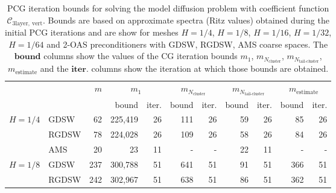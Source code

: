 \begin{table}[H]
\centering
\caption{PCG iteration bounds for solving the model diffusion problem with coefficient function $\mathcal{C}_{\mathrm{3layer, \ vert}}$. Bounds are based on approximate spectra (Ritz values) obtained during the initial PCG iterations and are show for meshes $H=1/4$, $H=1/8$, $H=1/16$, $H=1/32$, $H=1/64$ and 2-OAS preconditioners with GDSW, RGDSW, AMS coarse spaces. The $\textbf{bound}$ columns show the values of the CG iteration bounds $m_1$, $m_{N_{\text{cluster}}}$, $m_{N_{\text{tail-cluster}}}$, $m_{\text{estimate}}$ and the $\textbf{iter.}$ columns show the iteration at which those bounds are obtained.}
\label{tab:cg_iteration_bound_coef=3lvert}
\begin{tabular}{llrrrrrrrrr}
\toprule
 &  & \bfseries $m$ & \multicolumn{2}{|c|}{\bfseries $m_1$} & \multicolumn{2}{|c|}{\bfseries $m_{N_{\text{cluster}}}$} & \multicolumn{2}{|c|}{\bfseries $m_{N_{\text{tail-cluster}}}$} & \multicolumn{2}{|c|}{\bfseries $m_{\text{estimate}}$} \\
 &  &  & bound & iter. & bound & iter. & bound & iter. & bound & iter. \\
\midrule
\multirow[c]{3}{*}{\bfseries $H=1/4$} & GDSW & 62 & {\cellcolor[HTML]{E2E4FB}} \color[HTML]{000000} 225,419 & 26 & {\cellcolor[HTML]{ACB8F4}} \color[HTML]{000000} 111 & 26 & {\cellcolor[HTML]{405FE5}} \color[HTML]{F1F1F1} 59 & 26 & {\cellcolor[HTML]{768BEC}} \color[HTML]{F1F1F1} 85 & 26 \\
\cline{2-11}
\bfseries  & RGDSW & 78 & {\cellcolor[HTML]{E2E4FB}} \color[HTML]{000000} 224,028 & 26 & {\cellcolor[HTML]{ACB8F4}} \color[HTML]{000000} 109 & 26 & {\cellcolor[HTML]{768BEC}} \color[HTML]{F1F1F1} 58 & 26 & {\cellcolor[HTML]{405FE5}} \color[HTML]{F1F1F1} 84 & 26 \\
\cline{2-11}
\bfseries  & AMS & 20 & {\cellcolor[HTML]{768BEC}} \color[HTML]{F1F1F1} 23 & 11 & {\cellcolor[HTML]{ACB8F4}} \color[HTML]{000000} {\cellcolor[HTML]{E2E4FB}} - & - & {\cellcolor[HTML]{405FE5}} \color[HTML]{F1F1F1} 22 & 11 & {\cellcolor[HTML]{E2E4FB}} \color[HTML]{000000} {\cellcolor[HTML]{E2E4FB}} - & - \\
\cline{1-11} \cline{2-11}
\multirow[c]{3}{*}{\bfseries $H=1/8$} & GDSW & 237 & {\cellcolor[HTML]{E2E4FB}} \color[HTML]{000000} 300,788 & 51 & {\cellcolor[HTML]{ACB8F4}} \color[HTML]{000000} 641 & 51 & {\cellcolor[HTML]{768BEC}} \color[HTML]{F1F1F1} 91 & 51 & {\cellcolor[HTML]{405FE5}} \color[HTML]{F1F1F1} 366 & 51 \\
\cline{2-11}
\bfseries  & RGDSW & 242 & {\cellcolor[HTML]{E2E4FB}} \color[HTML]{000000} 302,967 & 51 & {\cellcolor[HTML]{ACB8F4}} \color[HTML]{000000} 638 & 51 & {\cellcolor[HTML]{768BEC}} \color[HTML]{F1F1F1} 86 & 51 & {\cellcolor[HTML]{405FE5}} \color[HTML]{F1F1F1} 362 & 51 \\

\end{tabular}
\end{table}
